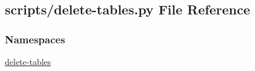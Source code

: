 \hypertarget{delete-tables_8py}{\subsection{scripts/delete-\/tables.py File Reference}
\label{delete-tables_8py}
}
\subsubsection*{Namespaces}
\begin{DoxyCompactItemize}
\item 
\hyperlink{namespacedelete-tables}{delete-\/tables}
\end{DoxyCompactItemize}
